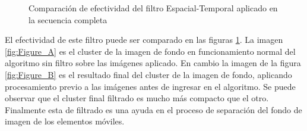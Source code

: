 \begin{figure}
\centering     %
{}
\caption[Comparación de efectividad del filtro en una secuencia completa]{Comparación de efectividad del filtro Espacial-Temporal aplicado en la secuencia completa }
\label{fig:result_spatio_temporal_filter}
\end{figure}


El efectividad de este filtro puede ser comparado en las figuras \ref{fig:result_spatio_temporal_filter}. La imagen \ref{fig:Figure_A} es el cluster de la imagen de fondo en funcionamiento normal del algoritmo sin filtro sobre las imágenes aplicado. En cambio la imagen de la figura \ref{fig:Figure_B} es el resultado final del cluster de la imagen de fondo,  aplicando procesamiento previo a las imágenes antes de ingresar en el algoritmo. Se puede observar que el cluster final filtrado es mucho más compacto que el otro. Finalmente esta de filtrado es una ayuda en el proceso de separación del fondo de imagen de los elementos móviles.



